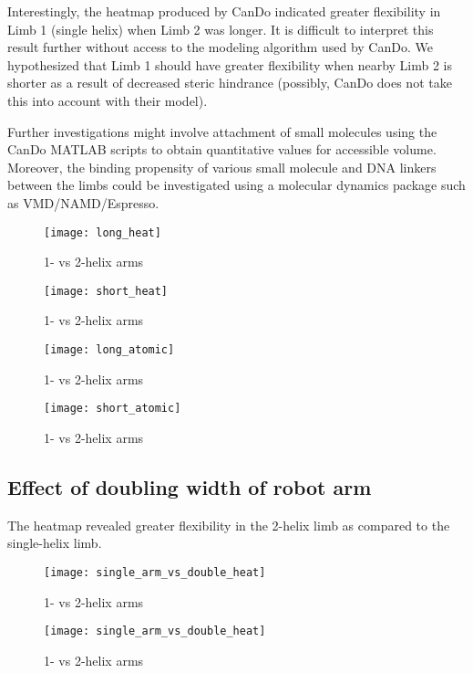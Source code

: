 \documentclass{article}
\begin{document}
Interestingly, the heatmap produced by CanDo indicated greater flexibility in Limb 1 (single helix) when Limb 2 was longer. It is difficult to interpret this result further without access to the modeling algorithm used by CanDo. We hypothesized that Limb 1 should have greater flexibility when nearby Limb 2 is shorter as a result of decreased steric hindrance (possibly, CanDo does not take this into account with their model).

Further investigations might involve attachment of small molecules using the CanDo MATLAB scripts to obtain quantitative values for accessible volume. Moreover, the binding propensity of various small molecule and DNA linkers between the limbs could be investigated using a molecular dynamics package such as VMD/NAMD/Espresso.



\begin{figure}
\texttt{[image: long\_heat]}
\caption{1- vs 2-helix arms}
  \label{fig:long_heat}
\end{figure}

\begin{figure}
\texttt{[image: short\_heat]}
\caption{1- vs 2-helix arms}
  \label{fig:short_heat}
\end{figure}

\begin{figure}
\texttt{[image: long\_atomic]}
\caption{1- vs 2-helix arms}
  \label{fig:long_atomic}
\end{figure}

\begin{figure}
\texttt{[image: short\_atomic]}
\caption{1- vs 2-helix arms}
  \label{fig:short_atomic}
\end{figure}


\subsection{Effect of doubling width of robot arm}
The heatmap revealed greater flexibility in the 2-helix limb as compared to the single-helix limb. 
\begin{figure}
    \texttt{[image: single\_arm\_vs\_double\_heat]}
  \caption{1- vs 2-helix arms}
  \label{fig:single_arm}
\end{figure}

\begin{figure}
\texttt{[image: single\_arm\_vs\_double\_heat]}
\caption{1- vs 2-helix arms}
  \label{fig:single_arm2}
\end{figure}
\end{document}
